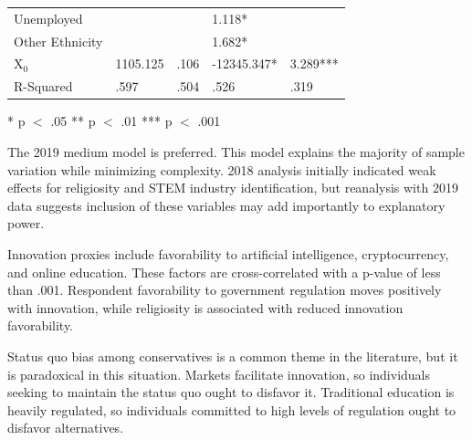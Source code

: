 \documentclass[review]{elsarticle}
\begin{document}
\begin{table}
\begin{tabular}{lllll}
            Unemployed &  &  & 1.118* &  \\ %
            Other Ethnicity &  &  & 1.682* & \\ %
            X$_0$ & 1105.125 & .106 & -12345.347* & 3.289*** \\
            \bottomrule
            R-Squared & .597 & .504 & .526 & .319 %
        
            \end{tabular}
            \begin{tablenotes}
                \item{
                    * p $<$ .05
                    ** p $<$ .01
                    *** p $<$ .001
                }
            \end{tablenotes}
            \label{tab:models}
            \end{table}
        
        The 2019 medium model is preferred. This model explains the majority of sample variation
        while minimizing complexity.
        2018 analysis initially indicated weak effects for religiosity and STEM industry identification,
        but reanalysis with 2019 data suggests inclusion of these variables may add importantly to
        explanatory power.
        
        Innovation proxies include favorability to artificial
        intelligence, cryptocurrency, and online education. These factors are
        cross-correlated with a p-value of less than .001.
        Respondent favorability to government regulation moves positively with
        innovation, while religiosity is associated with reduced
        innovation favorability.
        
        Status quo bias among conservatives is a common theme in the literature\cite{eidelman2012bias},
        but it is paradoxical in this situation.
        Markets facilitate innovation\cite{baumol2002free},
        so individuals seeking to maintain the status quo ought to disfavor it.
        Traditional education is heavily regulated,
        so individuals committed to high levels of regulation ought to disfavor
        alternatives.
\end{document}
